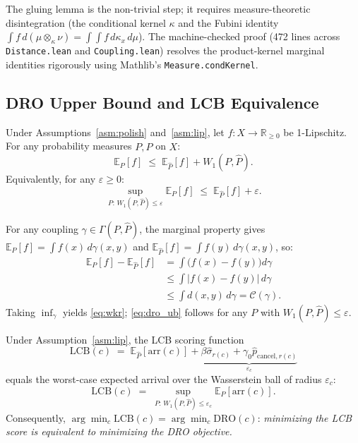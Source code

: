 \documentclass[opre,dblanonrev]{informs4}
\renewenvironment{proof}{\Trivlist\item[\hspace*{1em}\hskip\labelsep{\itshape Proof.\enskip}]\ignorespaces}{\endTrivlist\addvspace{0pt}}
\begin{document}
\begin{remark}
The gluing lemma is the non-trivial step; it requires measure-theoretic
disintegration (the conditional kernel $\kappa$ and the Fubini identity
$\int f\,d(\mu \otimes_\kappa \nu) = \int\!\int f\,d\kappa_x\,d\mu$).
The machine-checked proof (472 lines across \texttt{Distance.lean} and
\texttt{Coupling.lean}) resolves the product-kernel marginal identities
rigorously using Mathlib's \texttt{Measure.condKernel}.
\end{remark}

\subsection{DRO Upper Bound and LCB Equivalence}

\begin{theorem}\label{thm:dro}
Under Assumptions~\ref{asm:polish} and~\ref{asm:lip},
let $f:X\to\mathbb{R}_{\geq 0}$ be 1-Lipschitz.
For any probability measures $P, \hat{P}$ on $X$:
\begin{equation}
\mathbb{E}_P[f] \;\leq\; \mathbb{E}_{\hat{P}}[f] + W_1(P,\hat{P}).
\label{eq:wkr}
\end{equation}
Equivalently, for any $\varepsilon \geq 0$:
\begin{equation}
\sup_{P:\,W_1(P,\hat{P})\leq\varepsilon} \mathbb{E}_P[f]
\;\leq\; \mathbb{E}_{\hat{P}}[f] + \varepsilon.
\label{eq:dro_ub}
\end{equation}
\end{theorem}

\begin{proof}
For any coupling $\gamma \in \Gamma(P,\hat{P})$, the marginal property gives
$\mathbb{E}_P[f] = \int f(x)\,d\gamma(x,y)$ and
$\mathbb{E}_{\hat{P}}[f] = \int f(y)\,d\gamma(x,y)$, so:
\begin{align*}
\mathbb{E}_P[f] - \mathbb{E}_{\hat{P}}[f]
&= \int\bigl(f(x)-f(y)\bigr)d\gamma \\
&\leq \int |f(x)-f(y)|\,d\gamma \\
&\leq \int d(x,y)\,d\gamma
= \mathcal{C}(\gamma).
\end{align*}
Taking $\inf_\gamma$ yields \eqref{eq:wkr};
\eqref{eq:dro_ub} follows for any $P$ with $W_1(P,\hat P)\le\varepsilon$.
\end{proof}

\begin{corollary}\label{cor:lcb_dro}
Under Assumption~\ref{asm:lip}, the LCB scoring function
\[
\mathrm{LCB}(c) \;=\;
\mathbb{E}_{\hat{P}}[\mathrm{arr}(c)] + \underbrace{\beta\hat\sigma_{r(c)} + \gamma_0\hat{p}_{\mathrm{cancel},r(c)}}_{\varepsilon_c}
\]
equals the worst-case expected arrival over the Wasserstein ball of radius $\varepsilon_c$:
\[
\mathrm{LCB}(c) \;=\;
\sup_{P:\,W_1(P,\hat{P})\leq\varepsilon_c}\mathbb{E}_P[\mathrm{arr}(c)].
\]
Consequently, $\arg\min_c \mathrm{LCB}(c) = \arg\min_c \mathrm{DRO}(c)$:
\emph{minimizing the LCB score is equivalent to minimizing the DRO objective.}
\end{corollary}
\end{document}
